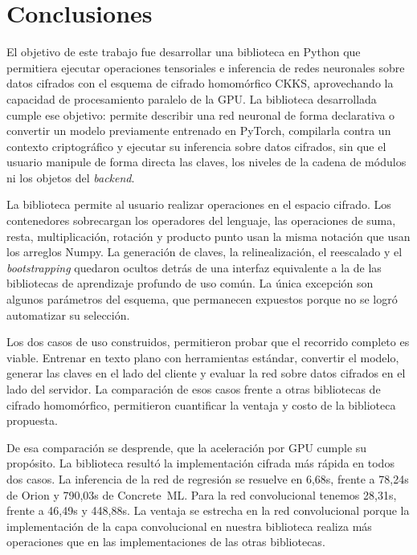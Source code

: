 \chapter*{Conclusiones}

El objetivo de este trabajo fue desarrollar una biblioteca en Python que permitiera ejecutar operaciones tensoriales e inferencia de redes neuronales sobre datos cifrados con el esquema de cifrado homomórfico CKKS, aprovechando la capacidad de procesamiento paralelo de la GPU. La biblioteca desarrollada cumple ese objetivo: permite describir una red neuronal de forma declarativa o convertir un modelo previamente entrenado en PyTorch, compilarla contra un contexto criptográfico y ejecutar su inferencia sobre datos cifrados, sin que el usuario manipule de forma directa las claves, los niveles de la cadena de módulos ni los objetos del \textit{backend}.

La biblioteca permite al usuario realizar operaciones en el espacio cifrado. Los contenedores sobrecargan los operadores del lenguaje, las operaciones de suma, resta, multiplicación, rotación y producto punto usan la misma notación que usan los arreglos Numpy. La generación de claves, la relinealización, el reescalado y el \textit{bootstrapping} quedaron ocultos detrás de una interfaz equivalente a la de las bibliotecas de aprendizaje profundo de uso común. La única excepción son algunos parámetros del esquema, que permanecen expuestos porque no se logró automatizar su selección.

Los dos casos de uso construidos, permitieron probar que el recorrido completo es viable. Entrenar en texto plano con herramientas estándar, convertir el modelo, generar las claves en el lado del cliente y evaluar la red sobre datos cifrados en el lado del servidor. La comparación de esos casos frente a otras bibliotecas de cifrado homomórfico, permitieron cuantificar la ventaja y costo de la biblioteca propuesta.

De esa comparación se desprende, que la aceleración por GPU cumple su propósito. La biblioteca resultó la implementación cifrada más rápida en todos dos casos. La inferencia de la red de regresión se resuelve en 6,68s, frente a 78,24s de Orion y 790,03s de Concrete~ML. Para la red convolucional tenemos 28,31s, frente a 46,49s y 448,88s. La ventaja se estrecha en la red convolucional porque la implementación de la capa convolucional en nuestra biblioteca realiza más operaciones que en las implementaciones de las otras bibliotecas.


